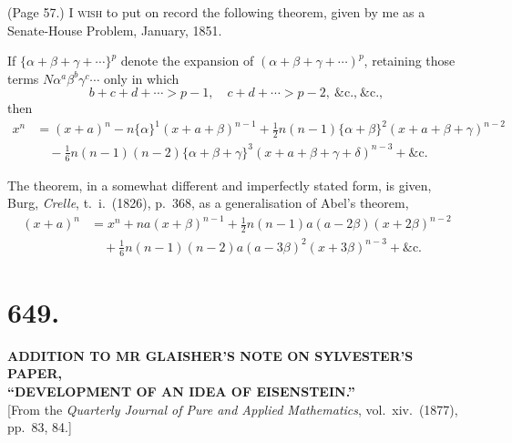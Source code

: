 \documentclass[11pt,a4paper]{article}
\begin{document}
\noindent (Page 57.) \textsc{I wish} to put on record the following theorem, given by me as a Senate-House Problem, January, 1851.

If $\{\alpha + \beta + \gamma + \cdots\}^p$ denote the expansion of $(\alpha + \beta + \gamma + \cdots)^p$, retaining those terms $N \alpha^a \beta^b \gamma^c \cdots$ only in which
\[
b + c + d + \cdots > p - 1,\quad c + d + \cdots > p - 2,\ \&\text{c.,}\ \&\text{c.},
\]
then
\begin{align*}
x^n &= (x + a)^n - n \{\alpha\}^1 (x + a + \beta)^{n-1} + \tfrac{1}{2} n(n-1) \{\alpha + \beta\}^2 (x + a + \beta + \gamma)^{n-2} \\
&\quad - \tfrac{1}{6} n(n-1)(n-2) \{\alpha + \beta + \gamma\}^3 (x + a + \beta + \gamma + \delta)^{n-3} + \&\text{c.}
\end{align*}

The theorem, in a somewhat different and imperfectly stated form, is given, Burg, \textit{Crelle}, t.~i.\ (1826), p.~368, as a generalisation of Abel's theorem,
\begin{align*}
(x + a)^n &= x^n + na (x + \beta)^{n-1} + \tfrac{1}{2} n(n-1) a (a - 2\beta)(x + 2\beta)^{n-2} \\
&\quad + \tfrac{1}{6} n(n-1)(n-2) a (a - 3\beta)^2 (x + 3\beta)^{n-3} + \&\text{c.}
\end{align*}

\bigskip


\section*{649.}

\begin{center}
\textbf{ADDITION TO MR GLAISHER'S NOTE ON SYLVESTER'S PAPER,\\``DEVELOPMENT OF AN IDEA OF EISENSTEIN.''}\\[1em]
[From the \textit{Quarterly Journal of Pure and Applied Mathematics}, vol.~xiv.\ (1877), pp.~83, 84.]
\end{center}

\medskip
\end{document}
